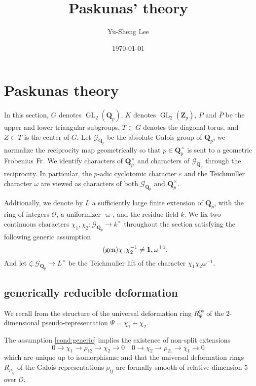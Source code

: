 \documentclass[leqno]{amsart}
\newcommand{\Gp}{\mathcal{G}_{\Qp}} %
\newcommand{\Fr}{\textnormal{Fr}} %
\DeclareMathOperator{\ps}{ps}
\DeclareMathOperator{\GL}{GL}
\newcommand{\Qp}{\mathbf{Q}_p}
\newcommand{\Zp}{\mathbf{Z}_p}
\newcommand{\oo}{\mathcal O}
\newcommand{\id}{\mathbf{1}}
\newcommand{\1}{\mathbf{1}}
\theoremstyle{definition}
\theoremstyle{remark}
\begin{document}
\title{Paskunas' theory}
\author[Y-S.~Lee]{Yu-Sheng Lee}
\address{Department of Mathematics, University  of Michigan, Ann Arbor, MI 48109, USA}
\date{\today}

\maketitle
\setcounter{tocdepth}{1}
\tableofcontents





\section{Paskunas theory}

In this section,
$G$ denotes  $\GL_2(\Qp)$, 
$K$ denotes  $\GL_2(\Zp)$,  
$P$ and  $\bar{P}$ 
be the upper and lower triangular subgroups,
$T\subset G$ denotes the diagonal torus,
and  $Z\subset T$ is the center of  $G$.
Let  $\Gp$ be the absolute Galois group of  $\Qp$,
we normalize the reciprocity map  geometrically
so that  $p\in \Qp^\times$
is sent to a geometric Frobenius  $\Fr$.
We identify characters of  $\Qp^\times$
and characters of  $\Gp$ through the reciprocity.
In particular, 
the $p$-adic cyclotomic character $\varepsilon$ 
and the Teichmuller character $\omega$
are viewed as characters of both  $\Gp$ and  $\Qp^\times$.

Addtionally,
we denote by $L$ a sufficiently large 
finite extension of  $\Qp$,
with the ring of integers  $\oo$,
a uniformizer  $\varpi$,
and the residue field $k$.
We fix 
two continuous characters
$\chi_1,\chi_2\colon \Gp\to k^\times$ 
throughout the section satisfying
the following generic assumption
\begin{equation}\label{cond:generic}\tag{\text{gen}}
	\chi_1\chi_2^{-1}\neq \id,\omega^{\pm1}.
\end{equation}
And let $\zeta\colon \Gp\to L^\times$
be the Teichmuller lift of the character  $\chi_1\chi_2\omega^{-1}$.


\subsection{generically reducible deformation}

We recall from \cite[\S B.1]{pask}
the structure of the universal deformation ring $R_{\Psi}^{\ps}$
of the $2$-dimensional pseudo-representation $\Psi=\chi_1+\chi_2$. 

The assumption \eqref{cond:generic}
implies the existence of non-split extensions
\[
    0\to \chi_1\to \rho_{12}\to \chi_2\to 0\quad
    0\to \chi_2\to \rho_{21}\to \chi_1\to 0
\]
which are unique up to isomorphisms;
and that the universal deformation rings
$R_{\rho_{ij}}$ of the Galois representations $\rho_{ij}$
are formally smooth of relative dimension $5$ over $\oo$.
\end{document}
